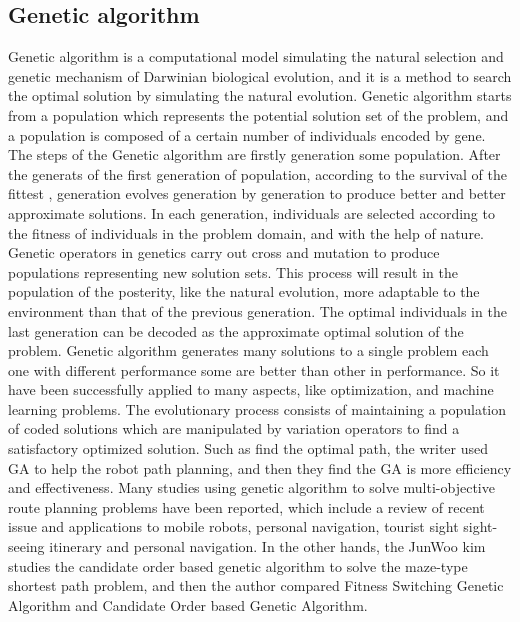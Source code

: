 \documentclass[12pt]{article}
\begin{document}
\subsection{Genetic algorithm}
Genetic algorithm is a computational model simulating the natural selection and genetic mechanism of Darwinian biological evolution, and it is a method to search the optimal solution by simulating the natural evolution. Genetic algorithm starts from a population which represents the potential solution set of the problem, and a population is composed of a certain number of individuals encoded by gene. The steps of the Genetic algorithm are firstly generation some population. After the generats of the first generation of population, according to the survival of the fittest , generation evolves generation by generation to produce better and better approximate solutions. In each generation, individuals are selected according to the fitness of individuals in the problem domain, and with the help of nature. Genetic operators in genetics carry out cross and mutation to produce populations representing new solution sets. This process will result in the population of the posterity, like the natural evolution, more adaptable to the environment than that of the previous generation. The optimal individuals in the last generation can be decoded as the approximate optimal solution of the problem. Genetic algorithm generates many solutions to a single problem each one with different performance some are better than other in performance. So it have been successfully applied to many aspects, like optimization, and machine learning problems. The evolutionary process consists of maintaining a population of coded solutions which are manipulated by variation operators to find a satisfactory optimized solution. Such as find the optimal path, the writer used GA to help the robot path planning\cite{Alnasser2016}, and then they find the GA is more efficiency and effectiveness. 
Many studies using genetic algorithm to solve multi-objective route planning problems have been reported\cite{Diao2019}, which include a review of recent issue and applications to mobile robots, personal navigation, tourist sight sight-seeing itinerary and personal navigation. In the other hands, the JunWoo\cite{Kim2019} kim studies the candidate order based genetic algorithm to solve the maze-type shortest path problem, and then the author compared Fitness Switching Genetic Algorithm and Candidate Order based Genetic Algorithm.
\end{document}
